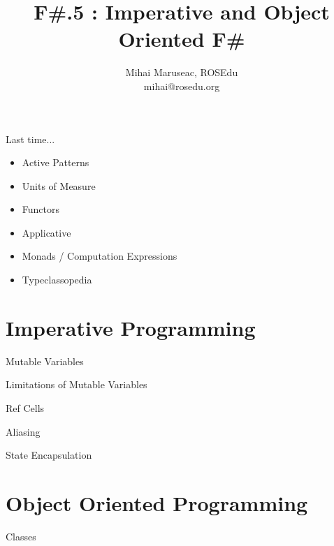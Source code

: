\documentclass{beamer}
\title{F\#.5 : Imperative and Object Oriented F\#}
\author{Mihai Maruseac, ROSEdu\\mihai@rosedu.org}
\begin{document}
\maketitle

\begin{frame}
  \tableofcontents
\end{frame}

\begin{frame}{Last time...}
  \begin{itemize}[<+->]
    \item Active Patterns
    \item Units of Measure
    \item Functors
    \item Applicative
    \item Monads / Computation Expressions
    \item Typeclassopedia
  \end{itemize}
\end{frame}

\section{Imperative Programming}
\frame{\tableofcontents[currentsection]}

\begin{frame}{Mutable Variables}
\end{frame}

\begin{frame}{Limitations of Mutable Variables}
\end{frame}

\begin{frame}{Ref Cells}
\end{frame}

\begin{frame}{Aliasing}
\end{frame}

\begin{frame}{State Encapsulation}
\end{frame}

\section{Object Oriented Programming}
\frame{\tableofcontents[currentsection]}

\begin{frame}{Classes}
\end{frame}
\end{document}
